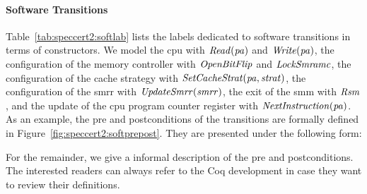 \paragraph{Software Transitions}
%
Table~\ref{tab:speccert2:softlab} lists the labels dedicated to software
transitions in terms of constructors.
%
We model the \ac{cpu} \IOs with \( \func{Read}(\var{pa}) \) and
\( \func{Write}(\var{pa}) \), the configuration of the memory controller with
\( \func{OpenBitFlip} \) and \( \func{LockSmramc} \), the configuration of the
cache strategy with \( \func{SetCacheStrat}(\var{pa}, \var{strat}) \), the
configuration of the \ac{smrr} with \( \func{UpdateSmrr}(\var{smrr}) \), the
exit of the \ac{smm} with $\func{Rsm}$, and the update of the \ac{cpu} program
counter register with $\func{NextInstruction}(\var{pa})$.
%
As an example, the pre and postconditions of the  transitions are
formally defined in Figure~\ref{fig:speccert2:softprepost}.
%
%
They are presented under the following form:
%
\begin{prooftree}
\end{prooftree}
%
For the remainder, we give a informal description of the pre and postconditions.
%
The interested readers can always refer to the Coq development in case they want
to review their definitions.
%

